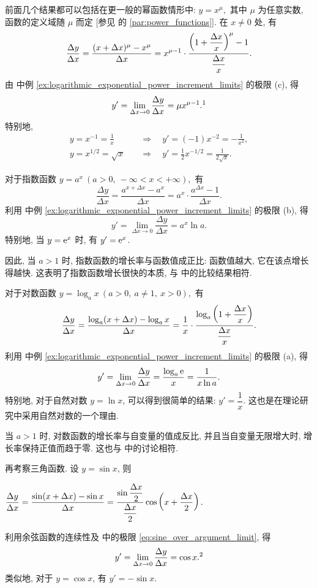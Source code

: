 \myrefparagraph{5\textdegree}\label{ex:derivative_real_power}
前面几个结果都可以包括在更一般的幂函数情形中:
$
y=x^\mu,
$
其中 $\mu$ 为任意实数, 函数的定义域随 $\mu$ 而定
[参见  的 \ref{par:power_functions}].
在 $x\neq0$ 处, 有
$$
\frac{\Delta y}{\Delta x}
=\frac{(x+\Delta x)^\mu-x^\mu}{\Delta x}
=x^{\mu-1}\cdot
\frac{\left( 1+\dfrac{\Delta x}{x} \right)^\mu-1}{\dfrac{\Delta x}{x}}.
$$
由  中例 \ref{ex:logarithmic_exponential_power_increment_limits} 的极限 (c), 得
$$
y'=\lim_{\Delta x\to0}\frac{\Delta y}{\Delta x}=\mu x^{\mu-1}.\text{\footnotemark}
$$
特别地,
$$
\begin{aligned}
y=x^{-1}=\frac1x&\quad\Longrightarrow\quad
 y'=(-1)x^{-2}=-\frac1{x^2},\\
y=x^{1/2}=\sqrt{x}&\quad\Longrightarrow\quad
 y'=\frac12x^{-1/2}=\frac1{2\sqrt{x}}.
\end{aligned}
$$

\myrefparagraph{6\textdegree}\label{ex:derivative_exponential}
对于指数函数
$
y=a^x\ (a>0,\ -\infty<x<+\infty),
$
有
$$
\frac{\Delta y}{\Delta x}
=\frac{a^{x+\Delta x}-a^x}{\Delta x}
=a^x\cdot\frac{a^{\Delta x}-1}{\Delta x}.
$$
利用  中例 \ref{ex:logarithmic_exponential_power_increment_limits} 的极限 (b), 得
$$
y'=\lim_{\Delta x\to0}\frac{\Delta y}{\Delta x}=a^x\ln a.
$$
特别地, 当 $y=\mathrm{e}^x$ 时, 有 $y'=\mathrm{e}^x$.

因此, 当 $a>1$ 时, 指数函数的增长率与函数值成正比:
函数值越大, 它在该点增长得越快.
这表明了指数函数增长很快的本质, 与  中的比较结果相符.

\myrefparagraph{7\textdegree}\label{ex:derivative_logarithm}
对于对数函数
$
y=\log_a x\ (a>0,\ a\neq1,\ x>0),
$
有
$$
\frac{\Delta y}{\Delta x}
=\frac{\log_a(x+\Delta x)-\log_a x}{\Delta x}
=\frac1x\cdot
\frac{\log_a\left( 1+\dfrac{\Delta x}{x} \right)}{\dfrac{\Delta x}{x}}.
$$
利用  中例 \ref{ex:logarithmic_exponential_power_increment_limits} 的极限 (a), 得
$$
y'=\lim_{\Delta x\to0}\frac{\Delta y}{\Delta x}
=\frac{\log_a\mathrm{e}}{x}=\frac1{x\ln a}.
$$
特别地, 对于自然对数 $y=\ln x$, 可以得到很简单的结果: $y'=\dfrac1x$.
这也是在理论研究中采用自然对数的一个理由.

当 $a>1$ 时, 对数函数的增长率与自变量的值成反比,
并且当自变量无限增大时, 增长率保持正值而趋于零.
这也与  中的讨论相符.

\myrefparagraph{8\textdegree}\label{ex:derivative_trigonometric}
再考察三角函数. 设 $y=\sin x$, 则
\begin{center}
$
\dfrac{\Delta y}{\Delta x}
=\dfrac{\sin(x+\Delta x)-\sin x}{\Delta x}
=\dfrac{\sin\dfrac{\Delta x}2}{\dfrac{\Delta x}2}
 \cos\left( x+\dfrac{\Delta x}2 \right).
$
\end{center}
利用余弦函数的连续性及  中的极限 \eqref{eq:sine_over_argument_limit}, 得
$$
y'=\lim_{\Delta x\to0}\frac{\Delta y}{\Delta x}=\cos x.\text{\footnotemark}
$$
类似地, 对于 $y=\cos x$, 有 $y'=-\sin x$.

